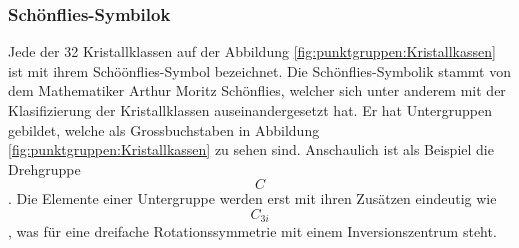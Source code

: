 \subsubsection{Schönflies-Symbilok}
Jede der 32 Kristallklassen auf der Abbildung \ref{fig:punktgruppen:Kristallkassen} ist mit ihrem Schöönflies-Symbol bezeichnet.
Die Schönflies-Symbolik stammt von dem Mathematiker Arthur Moritz Schönflies, 
welcher sich unter anderem mit der Klasifizierung der Kristallklassen auseinandergesetzt hat.
Er hat Untergruppen gebildet, welche als Grossbuchstaben in Abbildung \ref{fig:punktgruppen:Kristallkassen} zu sehen sind.
Anschaulich ist als Beispiel die Drehgruppe \[C\].
Die Elemente einer Untergruppe werden erst mit ihren Zusätzen eindeutig wie \[C_{3i}\], 
was für eine dreifache Rotationssymmetrie mit einem Inversionszentrum steht.






